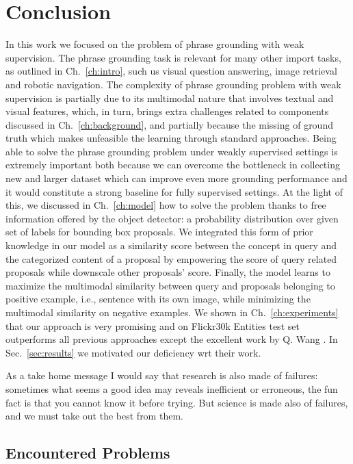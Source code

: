\chapter{Conclusion}
\label{ch:conclusion}

In this work we focused on the problem of phrase grounding with weak
supervision. The phrase grounding task is relevant for many other
import tasks, as outlined in Ch.~\ref{ch:intro}, such us visual
question answering, image retrieval and robotic navigation. The
complexity of phrase grounding problem with weak supervision is
partially due to its multimodal nature that involves textual and
visual features, which, in turn, brings extra challenges related to
components discussed in Ch.~\ref{ch:background}, and partially because
the missing of ground truth which makes unfeasible the learning
through standard approaches. Being able to solve the phrase grounding
problem under weakly supervised settings is extremely important both
because we can overcome the bottleneck in collecting new and larger
dataset which can improve even more grounding performance and it would
constitute a strong baseline for fully supervised settings. At the
light of this, we discussed in Ch.~\ref{ch:model} how to solve the
problem thanks to free information offered by the object detector: a
probability distribution over given set of labels for bounding box
proposals. We integrated this form of prior knowledge in our model as
a similarity score between the concept in query and the categorized
content of a proposal by empowering the score of query related
proposals while downscale other proposals' score. Finally, the model
learns to maximize the multimodal similarity between query and
proposals belonging to positive example, i.e., sentence with its own
image, while minimizing the multimodal similarity on negative
examples. We shown in Ch.~\ref{ch:experiments} that our approach is
very promising and on Flickr30k Entities test set outperforms all
previous approaches except the excellent work by Q. Wang \etal{}
\cite{wang2020maf}. In Sec.~\ref{sec:results} we motivated our
deficiency wrt their work.

As a take home message I would say that research is also made of
failures: sometimes what seems a good idea may reveals inefficient or
erroneous, the fun fact is that you cannot know it before trying. But
science is made also of failures, and we must take out the best from
them.

\section{Encountered Problems}

